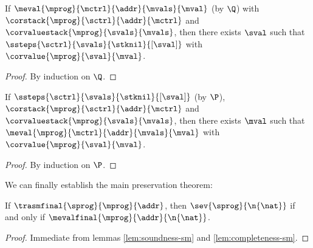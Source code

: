 \begin{lemma}[Soundness]
\label{lem:soundness-sm}
If $\meval{\mprog}{\mctrl}{\addr}{\mvals}{\mval}$ (by $\Q$) with $\corstack{\mprog}{\sctrl}{\addr}{\mctrl}$ and $\corvaluestack{\mprog}{\svals}{\mvals}$, then there exists $\sval$ such that $\ssteps{\sctrl}{\svals}{\stknil}{[\sval]}$ with $\corvalue{\mprog}{\sval}{\mval}$.
\end{lemma}


\begin{proof}
By induction on $\Q$.
\end{proof}

\begin{lemma}[Completeness]
\label{lem:completeness-sm}
If $\ssteps{\sctrl}{\svals}{\stknil}{[\sval]}$ (by $\P$), $\corstack{\mprog}{\sctrl}{\addr}{\mctrl}$ and $\corvaluestack{\mprog}{\svals}{\mvals}$, then there exists $\mval$ such that $\meval{\mprog}{\mctrl}{\addr}{\mvals}{\mval}$ with $\corvalue{\mprog}{\sval}{\mval}$.
\end{lemma}

\begin{proof}
By induction on $\P$.
\end{proof}


\vspace{0.5cm}

We can finally establish the main preservation theorem:

\begin{theorem}
\label{thm:preservation-sm} If $\trasmfinal{\sprog}{\mprog}{\addr}$, then $\sev{\sprog}{\n{\nat}}$ if and only if $\mevalfinal{\mprog}{\addr}{\n{\nat}}$.
\end{theorem}


\begin{proof}
Immediate from lemmas \ref{lem:soundness-sm} and \ref{lem:completeness-sm}.
\end{proof}
